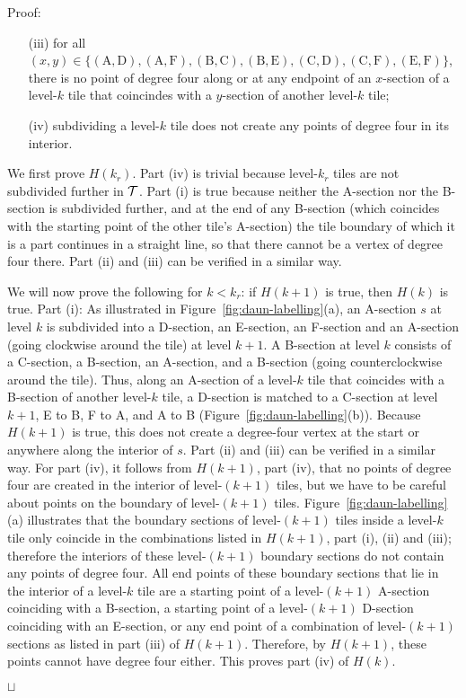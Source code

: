 \documentclass[11pt,a4paper]{article}
\newenvironment{proof}{Proof:}{\qed}
\def\squareforqed{\hbox{\rlap{$\sqcap$}$\sqcup$}}
\def\qed{\ifmmode\squareforqed\else{\unskip\nobreak\hfil
\penalty50\hskip1em\null\nobreak\hfil\squareforqed
\parfillskip=0pt\finalhyphendemerits=0\endgraf}\fi}
\begin{document}
\begin{proof}
\begin{itemize}
\item[(iii)] for all $(x,y) \in \{
    (\textrm{A},\textrm{D}),
    (\textrm{A},\textrm{F}),
    (\textrm{B},\textrm{C}),
    (\textrm{B},\textrm{E}),
    (\textrm{C},\textrm{D}),
    (\textrm{C},\textrm{F}),
    (\textrm{E},\textrm{F})
    \}$, there is no point of degree four along or at any endpoint of an $x$-section of a level-$k$ tile that coincindes with a $y$-section of another level-$k$ tile;
\item[(iv)] subdividing a level-$k$ tile does not create any points of degree four in its interior.
\end{itemize}
We first prove $H(k_r)$. Part (iv) is trivial because level-$k_r$ tiles are not subdivided further in ${\cal T}$. Part (i) is true because neither the A-section nor the B-section is subdivided further, and at the end of any B-section (which coincides with the starting point of the other tile's A-section) the tile boundary of which it is a part continues in a straight line, so that there cannot be a vertex of degree four there. Part (ii) and (iii) can be verified in a similar way.

We will now prove the following for $k < k_r$: if $H(k+1)$ is true, then $H(k)$ is true. Part (i): As illustrated in Figure~\ref{fig:daun-labelling}(a), an A-section $s$ at level $k$ is subdivided into a D-section, an E-section, an F-section and an A-section (going clockwise around the tile) at level $k+1$. A B-section at level $k$ consists of a C-section, a B-section, an A-section, and a B-section (going counterclockwise around the tile). Thus, along an A-section of a level-$k$ tile that coincides with a B-section of another level-$k$ tile, a D-section is matched to a C-section at level $k+1$, E to B, F to A, and A to B (Figure~\ref{fig:daun-labelling}(b)). Because $H(k+1)$ is true, this does not create a degree-four vertex at the start or anywhere along the interior of $s$. Part (ii) and (iii) can be verified in a similar way. For part (iv), it follows from $H(k+1)$, part (iv), that no points of degree four are created in the interior of level-$(k+1)$ tiles, but we have to be careful about points on the boundary of level-$(k+1)$ tiles. Figure~\ref{fig:daun-labelling}(a) illustrates that the boundary sections of level-$(k+1)$ tiles inside a level-$k$ tile only coincide in the combinations listed in $H(k+1)$, part (i), (ii) and (iii); therefore the interiors of these level-$(k+1)$ boundary sections do not contain any points of degree four. All end points of these boundary sections that lie in the interior of a level-$k$ tile are a starting point of a level-$(k+1)$ A-section coinciding with a B-section, a starting point of a level-$(k+1)$ D-section coinciding with an E-section, or any end point of a combination of level-$(k+1)$ sections as listed in part (iii) of $H(k+1)$. Therefore, by $H(k+1)$, these points cannot have degree four either. This proves part (iv) of $H(k)$.


\end{proof}
\end{document}
